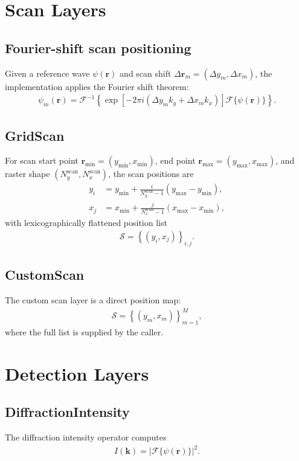 \documentclass[11pt]{article}
\begin{document}
\section{Scan Layers}
\subsection{Fourier-shift scan positioning}
Given a reference wave $\psi(\mathbf{r})$ and scan shift
$\Delta \mathbf{r}_m = (\Delta y_m, \Delta x_m)$, the implementation applies the Fourier
shift theorem:
\begin{align}
  \psi_m(\mathbf{r})
  = \mathcal{F}^{-1}\left\{
    \exp\!\left[-2\pi i
      \left(
        \Delta y_m k_y + \Delta x_m k_x
      \right)
    \right]
    \mathcal{F}\{\psi(\mathbf{r})\}
  \right\}.
\end{align}

\subsection{GridScan}
For scan start point $\mathbf{r}_{\min} = (y_{\min},x_{\min})$, end point
$\mathbf{r}_{\max} = (y_{\max},x_{\max})$, and raster shape
$(N_y^{\mathrm{scan}},N_x^{\mathrm{scan}})$, the scan positions are
\begin{align}
  y_i &= y_{\min} + \frac{i}{N_y^{\mathrm{scan}}-1}(y_{\max}-y_{\min}), \\
  x_j &= x_{\min} + \frac{j}{N_x^{\mathrm{scan}}-1}(x_{\max}-x_{\min}),
\end{align}
with lexicographically flattened position list
\begin{align}
  \mathcal{S}
  = \left\{ (y_i,x_j) \right\}_{i,j}.
\end{align}

\subsection{CustomScan}
The custom scan layer is a direct position map:
\begin{align}
  \mathcal{S}
  = \left\{ (y_m,x_m) \right\}_{m=1}^{M},
\end{align}
where the full list is supplied by the caller.

\section{Detection Layers}
\subsection{DiffractionIntensity}
The diffraction intensity operator computes
\begin{align}
  I(\mathbf{k}) = |\mathcal{F}\{\psi(\mathbf{r})\}|^2.
\end{align}
\end{document}
